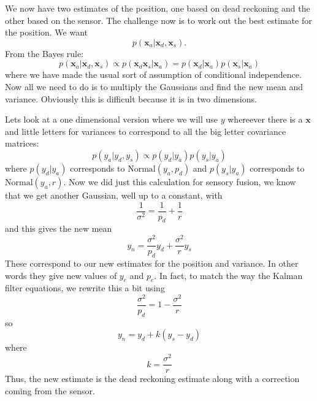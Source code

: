 \documentclass[12pt]{article}
\begin{document}
We now have two estimates of the position, one based on dead reckoning
and the other based on the sensor. The challenge now is to work out
the best estimate for the position. We want
\begin{equation}
  p(\mathbf{x}_a|\mathbf{x}_d,\mathbf{x}_s).
\end{equation}
From the Bayes rule:
\begin{equation}
p(\mathbf{x}_a|\mathbf{x}_d,\mathbf{x}_s)\propto p(\mathbf{x}_d\mathbf{x}_s|\mathbf{x}_a)=p(\mathbf{x}_d|\mathbf{x}_a)p(\mathbf{x}_s|\mathbf{x}_a)
\end{equation}
where we have made the usual sort of assumption of conditional
independence. Now all we need to do is to multiply the Gaussians and
find the new mean and variance. Obviously this is difficult because it
is in two dimensions. 

Lets look at a one dimensional version where we will use $y$ whereever
there is a $\mathbf{x}$ and little letters for variances to correspond
to all the big letter covariance matrices:
\begin{equation}
p(y_a|y_d,y_s)\propto p(y_d|y_a)p(y_s|y_a)
\end{equation}
where $p(y_d|y_a)$ corresponds to $\text{Normal}(y_a,p_d)$ and
$p(y_s|y_a)$ corresponds to $\text{Normal}(y_a,r)$. Now we did just
this calculation for sensory fusion, we know that we get another
Gaussian, well up to a constant, with
\begin{equation}
\frac{1}{\sigma^2}=\frac{1}{p_d}+\frac{1}{r}
\end{equation}
and this gives the new mean
\begin{equation}
y_n=\frac{\sigma^2}{p_d}y_d+\frac{\sigma^2}{r}y_s
\end{equation}
These correspond to our new estimates for the position and
variance. In other words they give new values of $y_e$ and $p_e$. In
fact, to match the way the Kalman filter equations, we rewrite this a
bit using
\begin{equation}
\frac{\sigma^2}{p_d}=1-\frac{\sigma^2}{r}
\end{equation}
so
\begin{equation}
y_n=y_d+k(y_s-y_d)
\end{equation}
where
\begin{equation}
k=\frac{\sigma^2}{r}
\end{equation}
Thus, the new estimate is the dead reckoning estimate along with a
correction coming from the sensor.
\end{document}
